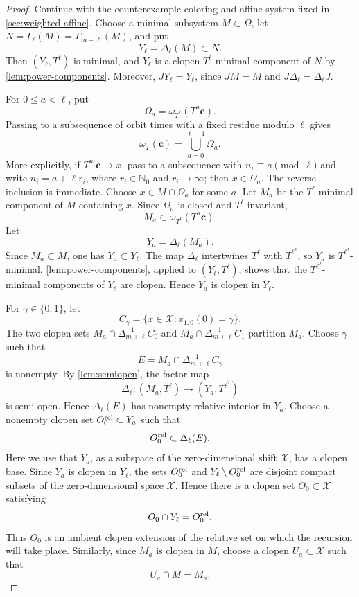 \documentclass[reqno,12pt]{amsart}
\newcommand{\Nzero}{\mathbb N_0}
\numberwithin{equation}{section}
\begin{document}
\begin{proof}
Continue with the counterexample coloring and affine system fixed in
\cref{sec:weighted-affine}. Choose a minimal subsystem $M\subset\Omega$, let
$N=\Gamma_\ell(M)=\Gamma_{m+\ell}(M)$, and put
\[
 Y_\ell=\Delta_\ell(M)\subset N.
\]
Then $(Y_\ell,T^\ell)$ is minimal, and $Y_\ell$ is a clopen
$T^\ell$-minimal component of $N$ by
\cref{lem:power-components}.  Moreover,
$JY_\ell=Y_\ell$, since $JM=M$ and
$J\Delta_\ell=\Delta_\ell J$.

For $0\leq a<\ell$, put
\[
 \Omega_a=\omega_{T^\ell}(T^a\mathbf c).
\]
Passing to a subsequence of orbit times with a fixed residue modulo
$\ell$ gives
\[
 \omega_T(\mathbf c)=\bigcup_{a=0}^{\ell-1}\Omega_a.
\]
More explicitly, if $T^{n_i}\mathbf c\to x$, pass to a subsequence with
$n_i\equiv a\pmod\ell$ and write
$n_i=a+\ell r_i$, where $r_i\in\Nzero$ and $r_i\to\infty$; then
$x\in\Omega_a$.  The reverse inclusion is immediate.
Choose $x\in M\cap\Omega_a$ for some $a$. Let $M_a$ be the
$T^\ell$-minimal component of $M$ containing $x$. Since $\Omega_a$ is closed
and $T^\ell$-invariant,
\begin{equation}\label{eq:phase-omega}
 M_a\subset\omega_{T^\ell}(T^a\mathbf c).
\end{equation}
Let
\[
 Y_a=\Delta_\ell(M_a).
\]
Since $M_a\subset M$, one has $Y_a\subset Y_\ell$.  The map
$\Delta_\ell$ intertwines $T^\ell$ with $T^{\ell^2}$, so $Y_a$ is
$T^{\ell^2}$-minimal. \cref{lem:power-components}, applied to $(Y_\ell,T^\ell)$, shows
that the $T^{\ell^2}$-minimal components of $Y_\ell$ are clopen. Hence
$Y_a$ is clopen in $Y_\ell$.

For $\gamma\in\{0,1\}$, let
\[
 C_\gamma=\{x\in\mathcal X:x_{1,0}(0)=\gamma\}.
\]
The two clopen sets $M_a\cap\Delta_{m+\ell}^{-1}C_0$ and
$M_a\cap\Delta_{m+\ell}^{-1}C_1$ partition $M_a$. Choose $\gamma$ such that
\[
 E=M_a\cap\Delta_{m+\ell}^{-1}C_\gamma
\]
is nonempty. By \cref{lem:semiopen}, the factor map
\[
 \Delta_\ell:(M_a,T^\ell)\to(Y_a,T^{\ell^2})
\]
is semi-open. Hence $\Delta_\ell(E)$ has nonempty relative interior in
$Y_a$. Choose a nonempty clopen set $O_0^{\rm rel}\subset Y_a$ such that
\begin{equation}\label{eq:O0rel}
 O_0^{\rm rel}\subset\Delta_\ell(E).
\end{equation}
Here we use that $Y_a$, as a subspace of the zero-dimensional shift
$\mathcal X$, has a clopen base.
Since $Y_a$ is clopen in $Y_\ell$, the sets $O_0^{\rm rel}$ and
$Y_\ell\setminus O_0^{\rm rel}$ are disjoint compact subsets of the
zero-dimensional space $\mathcal X$. Hence there is a clopen set
$O_0\subset\mathcal X$ satisfying
\begin{equation}\label{eq:O0ambient}
 O_0\cap Y_\ell=O_0^{\rm rel}.
\end{equation}
Thus $O_0$ is an ambient clopen extension of the relative set on which
the recursion will take place.  Similarly, since $M_a$ is clopen in $M$,
choose a clopen
$U_a\subset\mathcal X$ such that
\begin{equation}\label{eq:Ua}
 U_a\cap M=M_a.
\end{equation}


\end{proof}
\end{document}

